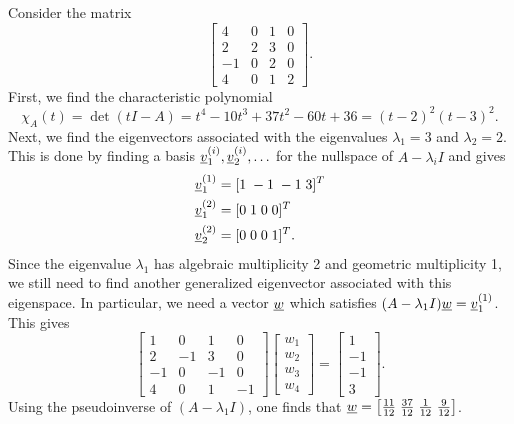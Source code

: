 \begin{example}
Consider the matrix
\begin{equation*}
\left[ \begin{array}{cccc} 4 & 0 & 1 & 0 \\ 2 & 2 & 3 & 0 \\ -1 & 0 & 2 & 0 \\ 4 & 0 & 1 & 2 \end{array} \right].
\end{equation*}
First, we find the characteristic polynomial
\[ \chi_A (t) = \det (t I - A) = t^4 - 10 t^3 + 37 t^2 -60 t + 36 = (t-2)^2 (t-3)^2. \]
Next, we find the eigenvectors associated with the eigenvalues $\lambda_1 = 3$ and $\lambda_2 = 2$.
This is done by finding a basis $\underline{v}^{(i)}_1, \underline{v}^{(i)}_2, \ldots$ for the nullspace of $A - \lambda_i I$ and gives
\begin{align*}
\underline{v}_1^{(1)} & = [ 1 \; -1 \; -1 \; 3 ]^T \\
\underline{v}_1^{(2)} & = [ 0 \; 1 \; 0 \; 0 ]^T \\
\underline{v}_2^{(2)} & = [ 0 \; 0 \; 0 \; 1 ]^T.
\end{align*}
Since the eigenvalue $\lambda_1$ has algebraic multiplicity 2 and geometric multiplicity 1, we still need to find another generalized eigenvector associated with this eigenspace.
In particular, we need a vector $\underline{w}$ which satisfies $(A - \lambda_1 I) \underline{w} = \underline{v}^{(1)}_1$.
This gives
\begin{equation*}
\left[ \begin{array}{cccc} 1 & 0 & 1 & 0 \\ 2 & -1 & 3 & 0 \\ -1 & 0 & -1 & 0 \\ 4 & 0 & 1 & -1 \end{array} \right]
\left[ \begin{array}{c} w_1 \\ w_2 \\ w_3 \\ w_4 \end{array} \right]
= \left[ \begin{array}{c} 1 \\ -1 \\ -1 \\ 3 \end{array} \right].
\end{equation*}
Using the pseudoinverse of $(A-\lambda_1 I)$, one finds that $\underline{w} = \left[ \frac{11}{12} \; \frac{37}{12} \; \frac{1}{12} \; \frac{9}{12} \right]$.

\end{example}
